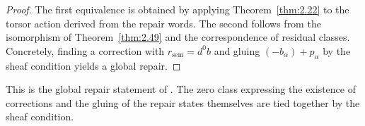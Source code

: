 \begin{proof}

The first equivalence is obtained by applying Theorem~\ref{thm:2.22} to the torsor
action derived from the repair words. The second follows from the isomorphism of
Theorem~\ref{thm:2.49} and the correspondence of residual classes. Concretely, finding a
correction with $r_{\mathrm{sem}}=d^0b$ and gluing $(-b_\alpha)+p_\alpha$ by the sheaf
condition yields a global repair.

\end{proof}

This is the global repair statement of
\cite[\href{https://arxiv.org/html/2608.21458v1\#S5.SS6}{Theorems~5.1(iii) and~5.2,
\S5.6}]{SAGA}. The zero class expressing the existence of corrections and the gluing of
the repair states themselves are tied together by the sheaf condition.

